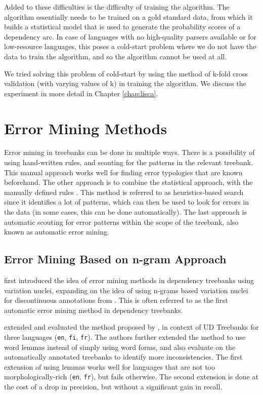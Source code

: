 Added to these difficulties is the difficulty of training the algorithm. The algorithm essentially needs to be trained on a gold standard data, from which it builds a statistical model that is used to generate the probability scores of a dependency arc. In case of languages with no high-quality parsers available or for low-resource languages, this poses a cold-start problem where we do not have the data to train the algorithm, and so the algorithm cannot be used at all.

We tried solving this problem of cold-start by using the method of k-fold cross validation (with varying values of k) in training the algorithm. We discuss the experiment in more detail in Chapter \ref{chap:lisca}.

\section{Error Mining Methods}
\label{sec:error-mining}

Error mining in treebanks can be done in multiple ways. There is a possibility of using hand-written rules, and scouting for the patterns in the relevant treebank. This manual approach works well for finding error typologies that are known beforehand. The other approach is to combine the statistical approach, with the manually defined rules \citep{ambati}. This method is referred to as heuristics-based search since it identifies a lot of patterns, which can then be used to look for errors in the data (in some cases, this can be done automatically). The last approach is automatic scouting for error patterns within the scope of the treebank, also known as automatic error mining.

\subsection{Error Mining Based on n-gram Approach}

\cite{boyd} first introduced the idea of error mining methods in dependency treebanks using variation nuclei, expanding on the idea of using n-grams based variation nuclei for discontinuous annotations from \cite{dickinson05}. This is often referred to as the first automatic error mining method in dependency treebanks.

\cite{de2017assessing} extended and evaluated the method proposed by \citeauthor{boyd}, in context of UD Treebanks for three languages (\verb|en|, \verb|fi|, \verb|fr|). The authors further extended the method to use word lemmas instead of simply using word forms, and also evaluate on the automatically annotated treebanks to identify more inconsistencies. The first extension of using lemmas works well for languages that are not too morphologically-rich (\verb|en|, \verb|fr|), but fails otherwise. The second extension is done at the cost of a drop in precision, but without a significant gain in recall.

